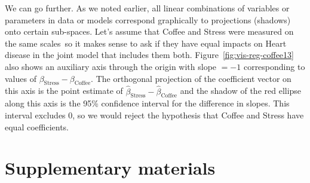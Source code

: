 \documentclass[11pt]{article}%
\newcommand*{\figref}[1]{Figure~\ref{#1}}
\newcommand*{\todo}[1]{\marginpar{ToDo:\small{#1}}}
\begin{document}
We can go further.  As we noted earlier, all linear combinations of variables or parameters
in data or models correspond graphically to projections (shadows) onto certain sub-spaces.
Let's assume that Coffee and Stress were measured on the same scales\, so it makes sense
to ask if they have equal impacts on Heart disease in the joint model that includes them both.
\figref{fig:vis-reg-coffee13} also shows an auxiliary axis through the origin with slope $=-1$
corresponding to values of $\beta_{\mathrm{Stress}} - \beta_{\mathrm{Coffee}}$. The orthogonal
projection of the coefficient vector on this axis is the point estimate of
$\widehat{\beta}_{\mathrm{Stress}} - \widehat{\beta}_{\mathrm{Coffee}}$
and the shadow of the red ellipse along this axis is the 95\% confidence interval
for the difference in slopes. This interval excludes 0, so we would reject the hypothesis
that Coffee and Stress have equal coefficients.




















\section{Supplementary materials}
\end{document}
